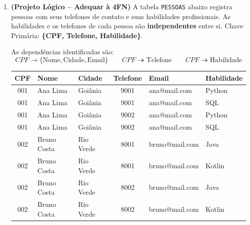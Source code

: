 \documentclass[12pt]{article}
\begin{document}
\begin{enumerate}[label=\textbf{Questão \arabic*:}, leftmargin=*]
  \vspace{0.4cm}

  \item \textbf{(Projeto Lógico -- Adequar à 4FN)} A tabela \texttt{PESSOAS} abaixo registra pessoas com seus telefones de contato e suas habilidades profissionais. As habilidades e os telefones de cada pessoa são \textbf{independentes} entre si. Chave Primária: \textbf{\{CPF, Telefone, Habilidade\}}.

  As dependências identificadas são:
  \[
    CPF \to \{\text{Nome}, \text{Cidade}, \text{Email}\}
    \qquad
    CPF \twoheadrightarrow \text{Telefone}
    \qquad
    CPF \twoheadrightarrow \text{Habilidade}
  \]

  \vspace{0.2cm}
  \centering
  \begin{tabular}{|c|l|l|c|l|l|}
    \hline
    \textbf{CPF} & \textbf{Nome} & \textbf{Cidade} & \textbf{Telefone} & \textbf{Email} & \textbf{Habilidade} \\ \hline
    001 & Ana Lima  & Goiânia     & 9001 & ana@mail.com  & Python \\ \hline
    001 & Ana Lima  & Goiânia     & 9001 & ana@mail.com  & SQL    \\ \hline
    001 & Ana Lima  & Goiânia     & 9002 & ana@mail.com  & Python \\ \hline
    001 & Ana Lima  & Goiânia     & 9002 & ana@mail.com  & SQL    \\ \hline
    002 & Bruno Costa & Rio Verde & 8001 & bruno@mail.com & Java   \\ \hline
    002 & Bruno Costa & Rio Verde & 8001 & bruno@mail.com & Kotlin \\ \hline
    002 & Bruno Costa & Rio Verde & 8002 & bruno@mail.com & Java   \\ \hline
    002 & Bruno Costa & Rio Verde & 8002 & bruno@mail.com & Kotlin \\ \hline
  \end{tabular}
  \flushleft
  \vspace{0.2cm}


\end{enumerate}
\end{document}
